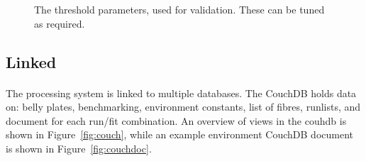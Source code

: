 \documentclass[12pt]{article}
\begin{document}
\begin{figure}
\centering
\noindent{}
  \caption{\centering The threshold parameters, used for validation. These can be tuned as required.}
  \label{fig:thresh}
\end{figure}

\subsection{Linked}
\paragraph{}
The processing system is linked to multiple databases. The CouchDB holds data on: belly plates, benchmarking, environment constants, list of fibres, runlists, and document for each run/fit combination. An overview of views in the couhdb is shown in Figure~\ref{fig:couch}, while an example environment CouchDB document is shown in Figure~\ref{fig:couchdoc}.
\end{document}
